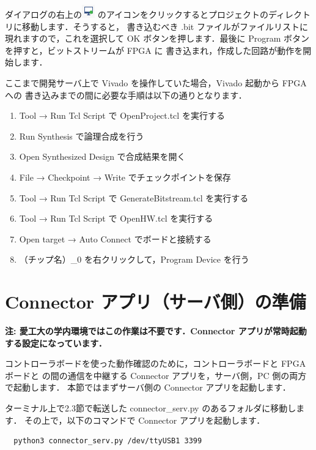 ダイアログの右上の\includegraphics[height=5truemm]{figs/Vivadoicon1_1.png}
のアイコンをクリックするとプロジェクトのディレクトリに移動します．そうすると，
書き込むべき .bit ファイルがファイルリストに現れますので，これを選択して OK 
ボタンを押します．最後に Program ボタンを押すと，ビットストリームが FPGA に
書き込まれ，作成した回路が動作を開始します．

ここまで開発サーバ上で Vivado を操作していた場合，Vivado 起動から FPGA への
書き込みまでの間に必要な手順は以下の通りとなります．

\begin{enumerate}
 \item Tool → Run Tcl Script で OpenProject.tcl を実行する
 \item Run Synthesis で論理合成を行う
 \item Open Synthesized Design で合成結果を開く
 \item File → Checkpoint → Write でチェックポイントを保存
 \item Tool → Run Tcl Script で GenerateBitstream.tcl を実行する
 \item Tool → Run Tcl Script で OpenHW.tcl を実行する
 \item Open target → Auto Connect でボードと接続する
 \item （チップ名）\_0 を右クリックして，Program Device を行う
\end{enumerate}

\section{Connector アプリ（サーバ側）の準備}

\textbf{注: 愛工大の学内環境ではこの作業は不要です．Connector アプリが常時起動
する設定になっています．} \vspace*{1ex}

コントローラボードを使った動作確認のために，コントローラボードと FPGA ボードと
の間の通信を中継する Connector アプリを，サーバ側，PC 側の両方で起動します．
本節ではまずサーバ側の Connector アプリを起動します．

ターミナル上で2.3節で転送した connector\_serv.py のあるフォルダに移動します．
その上で，以下のコマンドで Connector アプリを起動します．
\begin{verbatim}
  python3 connector_serv.py /dev/ttyUSB1 3399
\end{verbatim}

